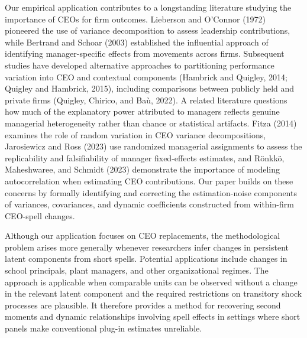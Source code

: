 \documentclass[sigconf,nonacm]{acmart}
\begin{document}
Our empirical application contributes to a longstanding literature
studying the importance of CEOs for firm outcomes. Lieberson and
O'Connor (1972) pioneered the use of variance decomposition to assess
leadership contributions, while Bertrand and Schoar (2003) established
the influential approach of identifying manager-specific effects from
movements across firms. Subsequent studies have developed alternative
approaches to partitioning performance variation into CEO and
contextual components (Hambrick and Quigley, 2014; Quigley and Hambrick,
2015), including comparisons between publicly held and private firms
(Quigley, Chirico, and Ba\`u, 2022). A related literature questions how
much of the explanatory power attributed to managers reflects genuine
managerial heterogeneity rather than chance or statistical artifacts.
Fitza (2014) examines the role of random variation in CEO variance
decompositions, Jarosiewicz and Ross (2023) use randomized managerial
assignments to assess the replicability and falsifiability of manager
fixed-effects estimates, and R\"onkk\"o, Maheshwaree, and Schmidt (2023)
demonstrate the importance of modeling autocorrelation when estimating
CEO contributions. Our paper builds on these concerns by formally
identifying and correcting the estimation-noise components of variances,
covariances, and dynamic coefficients constructed from within-firm
CEO-spell changes.

\medskip
\noindent{}
\medskip

Although our application focuses on CEO replacements, the
methodological problem arises more generally whenever researchers infer
changes in persistent latent components from short spells. Potential
applications include changes in school principals, plant managers, and
other organizational regimes. The approach is applicable when comparable
units can be observed without a change in the relevant latent component
and the required restrictions on transitory shock processes are
plausible. It therefore provides a method for recovering second moments
and dynamic relationships involving  spell effects in settings
where short panels make conventional plug-in estimates unreliable.
\end{document}
